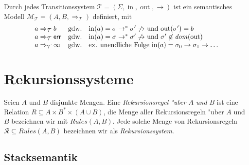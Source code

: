 \documentclass[12pt,a4paper,final]{article}
\begin{document}
\begin{definition}
  Durch jedes Transitionssystem \mbox{$\mathcal{T} = (\Sigma,\operatorname{in},\operatorname{out},\rightarrow)$} ist ein
  semantisches Modell \mbox{$\mathcal{M}_{\mathcal{T}} = (A,B,\Rightarrow_{\mathcal{T}})$} definiert,
  mit
  \[\begin{array}{lcl}
    a \Rightarrow_{\mathcal{T}} b
    & \text{gdw.} &
    \text{$\operatorname{in}(a) = \sigma \rightarrow^* \sigma' \not\rightarrow$ und $\operatorname{out}(\sigma') = b$} \\
    a \Rightarrow_{\mathcal{T}} \mathsf{err}
    & \text{gdw.} &
    \text{$\operatorname{in}(a) = \sigma \rightarrow^* \sigma' \not\rightarrow$ und $\sigma' \not\in \operatorname{\mathit{dom}}(\operatorname{out})$} \\
    a \Rightarrow_{\mathcal{T}} \infty
    & \text{gdw.} &
    \text{ex. unendliche Folge $\operatorname{in}(a) = \sigma_0 \rightarrow \sigma_1 \rightarrow \ldots$}
  \end{array}\]
\end{definition}



\section{Rekursionssysteme}
\label{sec:Rekursionssysteme}

\begin{definition}
  Seien $A$ und $B$ disjunkte Mengen.
  Eine \emph{Rekursionsregel "uber $A$ und $B$} ist eine Relation
  \mbox{$R \subseteq A \times B^* \times (A \cup B)$}, die Menge aller Rekursionsregeln
  "uber $A$ und $B$ bezeichnen wir mit \mbox{$\mathit{Rules}(A,B)$}.
  Jede solche Menge von Rekursionsregeln \mbox{$\mathcal{R} \subseteq \mathit{Rules}(A,B)$}
  bezeichnen wir als \emph{Rekursionssystem}.
\end{definition}



\subsection{Stacksemantik}
\label{sec:Stacksemantik}
\end{document}
